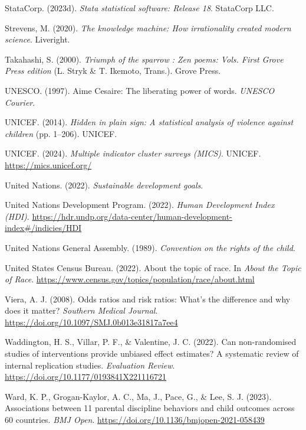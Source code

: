 \documentclass[
  letterpaper,
  DIV=11,
  numbers=noendperiod]{scrreprt}
\newlength{\cslhangindent}
\newenvironment{CSLReferences}[2] %
 {\begin{list}{}{%
  \setlength{\itemindent}{0pt}
  \setlength{\leftmargin}{0pt}
  \setlength{\parsep}{0pt}
  \ifodd #1
   \setlength{\leftmargin}{\cslhangindent}
   \setlength{\itemindent}{-1\cslhangindent}
  \fi
  \setlength{\itemsep}{#2\baselineskip}}}
 {\end{list}}
\begin{document}
\begin{CSLReferences}{1}{0}
StataCorp. (2023d). \emph{Stata statistical software: Release 18}.
StataCorp LLC.

Strevens, M. (2020). \emph{The knowledge machine: How irrationality
created modern science}. Liveright.

Takahashi, S. (2000). \emph{Triumph of the sparrow : Zen poems: Vols.
First Grove Press edition} (L. Stryk \& T. Ikemoto, Trans.). Grove
Press.

UNESCO. (1997). {A}ime {C}esaire: The liberating power of words.
\emph{UNESCO Courier}.

UNICEF. (2014). \emph{Hidden in plain sign: A statistical analysis of
violence against children} (pp. 1--206). UNICEF.

UNICEF. (2024). \emph{Multiple indicator cluster surveys (MICS)}.
UNICEF. \url{https://mics.unicef.org/}

United Nations. (2022). \emph{Sustainable development goals}.

United Nations Development Program. (2022). \emph{{Human Development
Index (HDI)}}.
\url{https://hdr.undp.org/data-center/human-development-index\#/indicies/HDI}

United Nations General Assembly. (1989). \emph{Convention on the rights
of the child}.

United States Census Bureau. (2022). About the topic of race. In
\emph{About the Topic of Race}.
\url{https://www.census.gov/topics/population/race/about.html}

Viera, A. J. (2008). Odds ratios and risk ratios: What's the difference
and why does it matter? \emph{Southern Medical Journal}.
\url{https://doi.org/10.1097/SMJ.0b013e31817a7ee4}

Waddington, H. S., Villar, P. F., \& Valentine, J. C. (2022). Can
non-randomised studies of interventions provide unbiased effect
estimates? A systematic review of internal replication studies.
\emph{Evaluation Review}.
\url{https://doi.org/10.1177/0193841X221116721}

Ward, K. P., Grogan-Kaylor, A. C., Ma, J., Pace, G., \& Lee, S. J.
(2023). Associations between 11 parental discipline behaviors and child
outcomes across 60 countries. \emph{BMJ Open}.
\url{https://doi.org/10.1136/bmjopen-2021-058439}


\end{CSLReferences}
\end{document}
